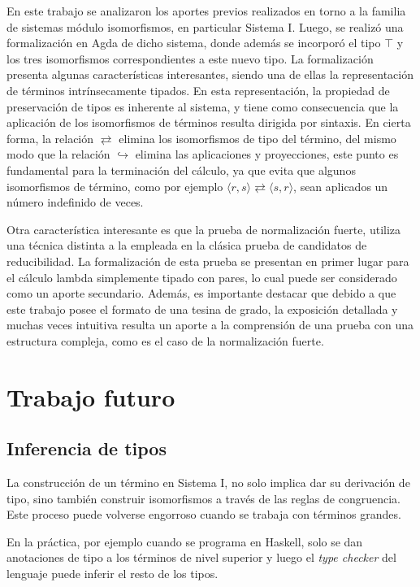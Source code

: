 En este trabajo se analizaron los aportes previos realizados en torno a la familia de sistemas módulo isomorfismos, en particular Sistema I.
Luego, se realizó una formalización en Agda de dicho sistema, donde además se incorporó el tipo $\top$ y los tres isomorfismos correspondientes a este nuevo tipo.
La formalización presenta algunas características interesantes, siendo una de ellas la representación de términos intrínsecamente tipados.
En esta representación, la propiedad de preservación de tipos es inherente al sistema, y tiene como consecuencia que la aplicación de los isomorfismos de términos resulta dirigida por sintaxis.
En cierta forma, la relación $\rightleftarrows$ elimina los isomorfismos de tipo del término, del mismo modo que la relación $\hookrightarrow$ elimina las aplicaciones y proyecciones, este punto es fundamental para la terminación del cálculo, ya que evita que algunos isomorfismos de término, como por ejemplo $\langle r,s \rangle\rightleftarrows\langle s,r \rangle$, sean aplicados un número indefinido de veces.

Otra característica interesante es que la prueba de normalización fuerte, utiliza una técnica distinta a la empleada en la clásica prueba de candidatos de reducibilidad.
La formalización de esta prueba se presentan en primer lugar para el cálculo lambda simplemente tipado con pares, lo cual puede ser considerado como un aporte secundario.
Además, es importante destacar que debido a que este trabajo posee el formato de una tesina de grado, la exposición detallada y muchas veces intuitiva resulta un aporte a la comprensión de una prueba con una estructura compleja, como es el caso de la normalización fuerte.

\section{Trabajo futuro}

\subsection{Inferencia de tipos}

La construcción de un término en Sistema I, no solo implica dar su derivación de tipo, sino también construir isomorfismos a través de las reglas de congruencia.
Este proceso puede volverse engorroso cuando se trabaja con términos grandes.

En la práctica, por ejemplo cuando se programa en Haskell, solo se dan anotaciones de tipo a los términos de nivel superior y luego el \textit{type checker} del lenguaje puede inferir el resto de los tipos.

